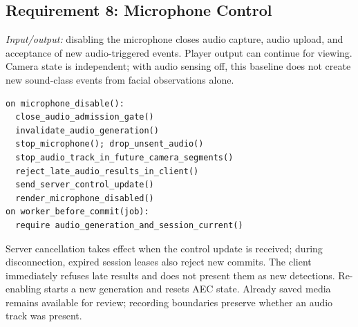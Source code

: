 \subsection{Requirement 8: Microphone Control}
\textit{Input/output:} disabling the microphone closes audio capture, audio upload, and acceptance of new audio-triggered events. Player output can continue for viewing. Camera state is independent; with audio sensing off, this baseline does not create new sound-class events from facial observations alone.
\par\smallskip\noindent\begin{minipage}{\columnwidth}
\begin{lstlisting}
on microphone_disable():
  close_audio_admission_gate()
  invalidate_audio_generation()
  stop_microphone(); drop_unsent_audio()
  stop_audio_track_in_future_camera_segments()
  reject_late_audio_results_in_client()
  send_server_control_update()
  render_microphone_disabled()
on worker_before_commit(job):
  require audio_generation_and_session_current()
\end{lstlisting}
\end{minipage}\par
Server cancellation takes effect when the control update is received; during disconnection, expired session leases also reject new commits. The client immediately refuses late results and does not present them as new detections. Re-enabling starts a new generation and resets AEC state. Already saved media remains available for review; recording boundaries preserve whether an audio track was present.

